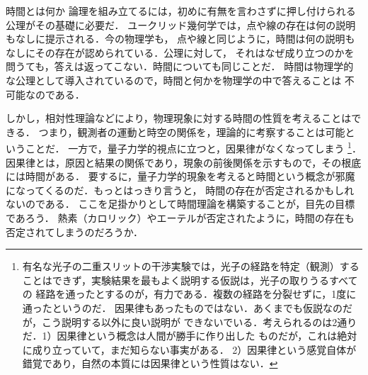 \begin{memo}{時間とは何か}
                論理を組み立てるには，初めに有無を言わさずに押し付けられる公理がその基礎に必要だ．
                ユークリッド幾何学では，点や線の存在は何の説明もなしに提示される．今の物理学も，
                点や線と同じように，時間は何の説明もなしにその存在が認められている．公理に対して，
                それはなぜ成り立つのかを問うても，答えは返ってこない．時間についても同じことだ．
                時間は物理学的な公理として導入されているので，時間と何かを物理学の中で答えることは
                不可能なのである．

                しかし，相対性理論などにより，物理現象に対する時間の性質を考えることはできる．
                つまり，観測者の運動と時空の関係を，理論的に考察することは可能ということだ．
                一方で，量子力学的視点に立つと，因果律がなくなってしまう
                    \footnote{
                        有名な光子の二重スリットの干渉実験では，光子の経路を特定（観測）する
                        ことはできず，実験結果を最もよく説明する仮説は，光子の取りうるすべての
                        経路を通ったとするのが，有力である．複数の経路を分裂せずに，1度に通ったというのだ．
                        因果律もあったものではない．あくまでも仮説なのだが，こう説明する以外に良い説明が
                        できないでいる．考えられるのは2通りだ．1）因果律という概念は人間が勝手に作り出した
                        ものだが，これは絶対に成り立っていて，まだ知らない事実がある．
                        2）因果律という感覚自体が錯覚であり，自然の本質には因果律という性質はない．
                    }．
                因果律とは，原因と結果の関係であり，現象の前後関係を示すもので，その根底には時間がある．
                要するに，量子力学的現象を考えると時間という概念が邪魔になってくるのだ．もっとはっきり言うと，
                時間の存在が否定されるかもしれないのである．
                ここを足掛かりとして時間理論を構築することが，目先の目標であろう．
                熱素（カロリック）やエーテルが否定されたように，時間の存在も否定されてしまうのだろうか．
            \end{memo}

